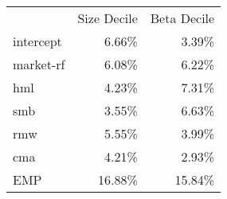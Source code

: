 \begin{tabular}{|lrr|}

      & \multicolumn{1}{l}{Size Decile} & \multicolumn{1}{l|}{Beta  Decile} \\
intercept & 6.66\% & 3.39\% \\
market-rf & 6.08\% & 6.22\% \\
hml   & 4.23\% & 7.31\% \\
smb   & 3.55\% & 6.63\% \\
rmw   & 5.55\% & 3.99\% \\
cma   & 4.21\% & 2.93\% \\
EMP   & 16.88\% & 15.84\% \\
\end{tabular}%
